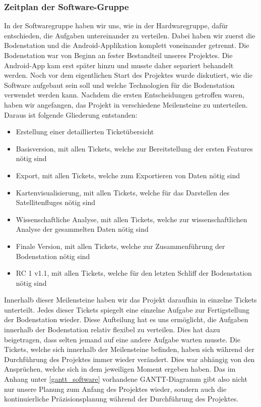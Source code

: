 \subsubsection{Zeitplan der Software-Gruppe}
In der Softwaregruppe haben wir uns, wie in der Hardwaregruppe, dafür entschieden, die Aufgaben untereinander zu verteilen. Dabei haben wir zuerst die Bodenstation und die Android-Applikation komplett voneinander getrennt. Die Bodenstation war von Beginn an fester Bestandteil unseres Projektes. Die Android-App kam erst später hinzu und musste daher separiert behandelt werden. Noch vor dem eigentlichen Start des Projektes wurde diskutiert, wie die Software aufgebaut sein soll und welche Technologien für die Bodenstation verwendet werden kann. Nachdem die ersten Entscheidungen getroffen waren, haben wir angefangen, das Projekt in verschiedene Meilensteine zu unterteilen. Daraus ist folgende Gliederung entstanden:
\begin{itemize}
    \item Erstellung einer detaillierten Ticketübersicht
    \item Basisversion, mit allen Tickets, welche zur Bereitstellung der ersten Features nötig sind
    \item Export, mit allen Tickets, welche zum Exportieren von Daten nötig sind
    \item Kartenvisualisierung, mit allen Tickets, welche für das Darstellen des Satellitenfluges nötig sind
    \item Wissenschaftliche Analyse, mit allen Tickets, welche zur wissenschaftlichen Analyse der gesammelten Daten nötig sind
    \item Finale Version, mit allen Tickets, welche zur Zusammenführung der Bodenstation nötig sind
    \item RC 1 v1.1, mit allen Tickets, welche für den letzten Schliff der Bodenstation nötig sind
\end{itemize}
Innerhalb dieser Meilensteine haben wir das Projekt daraufhin in einzelne Tickets unterteilt. Jedes dieser Tickets spiegelt eine einzelne Aufgabe zur Fertigstellung der Bodenstation wieder. Diese Aufteilung hat es uns ermöglicht, die Aufgaben innerhalb der Bodenstation relativ flexibel zu verteilen. Dies hat dazu beigetragen, dass selten jemand auf eine andere Aufgabe warten musste. Die Tickets, welche sich innerhalb der Meilensteine befinden, haben sich während der Durchführung des Projektes immer wieder verändert. Dies war abhängig von den Ansprüchen, welche sich in dem jeweiligen Moment ergeben haben. Das im Anhang unter \ref{gantt_software} vorhandene GANTT-Diagramm gibt also nicht nur unsere Planung zum Anfang des Projektes wieder, sondern auch die kontinuierliche Präzisionsplanung während der Durchführung des Projektes.

